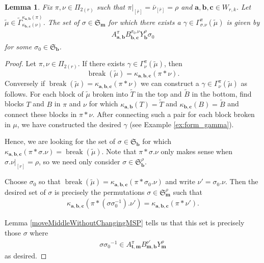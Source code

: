 \documentclass[10pt]{amsart}
\theoremstyle{definition}
\theoremstyle{definition}
\theoremstyle{plain}
\newtheorem{lemma}[lemma]{Lemma}
\theoremstyle{remark}
\theoremstyle{plain}
\theoremstyle{plain}
\newcommand{\SG}{\mathfrak{S}}
\newcommand{\bfa}{{\boldsymbol{a}}}
\newcommand{\bfb}{{\boldsymbol{b}}}
\newcommand{\bfc}{{\boldsymbol{c}}}
\newcommand{\bft}{{\boldsymbol{t}}}
\newcommand{\bfm}{{\boldsymbol{m}}}
\newcommand{\tmu}{{\tilde{\mu}}}
\newcommand{\ov}[1]{\bar{#1}}
\newcommand{\ovb}[1]{\left[\ov{#1}\right]}
\DeclareMathOperator{\Break}{break}
\begin{document}
\begin{lemma}\label{lem:number_of_sigma} Fix $\pi,\nu\in\Pi_{2(r)}$ such that $\pi|_{\ovb{r}}=\ov\nu_{\ovb{r}}=\rho$ and $\bfa,\bfb,\bfc\in W_{r,k}$. Let $\tmu\in\tilde{\Gamma}_{\kappa_{\bfb,\bfc}(\nu)}^{\kappa_{\bfa,\bfb}(\pi)}$. The set of $\sigma\in \SG_\bfm$ for which there exists a $\gamma\in\Gamma_{\sigma.\nu}^\pi(\tmu)$ is given by
\begin{align*}
    A_{\bfa,\bfb}^\pi B_{\bfb,\bfc}^{\sigma_0.\nu} Y_\bfb^\rho\sigma_0
\end{align*}
for some $\sigma_0\in \SG_\bfb$.
\end{lemma}

\begin{proof}

Let $\pi,\nu\in\Pi_{2(r)}$. If there exists $\gamma\in\Gamma^\pi_\nu(\tmu)$, then \[\Break(\tmu)=\kappa_{\bfa,\bfb,\bfc}(\pi\ast\nu).\] Conversely if $\Break(\tmu)=\kappa_{\bfa,\bfb,\bfc}(\pi\ast\nu)$ we can construct a $\gamma\in\Gamma_\nu^\pi(\tmu)$ as follows. For each block of $\tmu$ broken into $\tilde T$ in the top and $\tilde B$ in the bottom, find blocks $T$ and $B$ in $\pi$ and $\nu$ for which $\kappa_{\bfa,\bfb}(T)=\tilde T$ and $\kappa_{\bfb,\bfc}(B)=\tilde B$ and connect these blocks in $\pi\ast\nu$. After connecting such a pair for each block broken in $\mu$, we have constructed the desired $\gamma$ (see Example \ref{ex:form_gamma}).

Hence, we are looking for the set of $\sigma\in\SG_\bfb$ for which $\kappa_{\bfa,\bfb,\bfc}(\pi\ast\sigma.\nu)=\Break(\tmu)$. Note that $\pi\ast\sigma.\nu$ only makes sense when $\sigma.\nu|_{[r]}=\rho$, so we need only consider $\sigma\in \SG_\bfb^\rho$.

Choose $\sigma_0$ so that $\Break(\tmu)=\kappa_{\bfa,\bfb,\bfc}(\pi\ast\sigma_0.\nu)$ and write $\nu'=\sigma_0.\nu$. Then the desired set of $\sigma$ is precisely the permutations $\sigma\in \SG_\bfm^\rho$ such that \begin{align*}
     \kappa_{\bfa,\bfb,\bfc}(\pi\ast(\sigma\sigma_0^{-1}).\nu')=\kappa_{\bfa,\bfb,\bfc}(\pi\ast\nu').
\end{align*}

Lemma \ref{moveMiddleWithoutChangingMSP} tells us that this set is precisely those $\sigma$ where \begin{align*}
    \sigma{\sigma_0}^{-1}\in A_{\bft,\bfm}^\pi B_{\bfm,\bfb}^{\nu'}Y_\bfm^\rho
\end{align*} as desired.
\end{proof}
\end{document}
